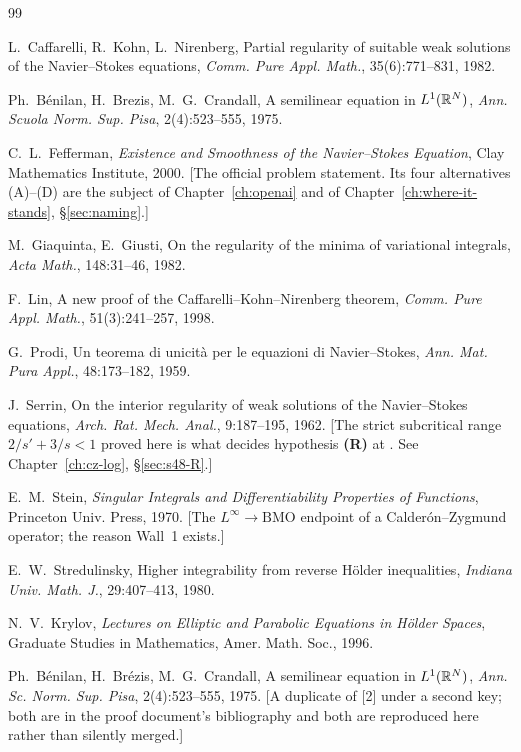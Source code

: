 \begin{thebibliography}{99}

  L.~Caffarelli, R.~Kohn, L.~Nirenberg,
  Partial regularity of suitable weak solutions of the Navier--Stokes
  equations,
  \emph{Comm. Pure Appl. Math.}, 35(6):771--831, 1982.

  Ph.~B\'enilan, H.~Brezis, M.~G.~Crandall,
  A semilinear equation in \(L^1(\mathbb{R}^N)\),
  \emph{Ann. Scuola Norm. Sup. Pisa}, 2(4):523--555, 1975.

  C.~L.~Fefferman,
  \emph{Existence and Smoothness of the Navier--Stokes Equation},
  Clay Mathematics Institute, 2000.
  \textsf{[The official problem statement. Its four alternatives (A)--(D) are
  the subject of Chapter~\ref{ch:openai} and of
  Chapter~\ref{ch:where-it-stands}, \S\ref{sec:naming}.]}

  M.~Giaquinta, E.~Giusti,
  On the regularity of the minima of variational integrals,
  \emph{Acta Math.}, 148:31--46, 1982.

  F.~Lin,
  A new proof of the Caffarelli--Kohn--Nirenberg theorem,
  \emph{Comm. Pure Appl. Math.}, 51(3):241--257, 1998.

  G.~Prodi,
  Un teorema di unicit\`a per le equazioni di Navier--Stokes,
  \emph{Ann. Mat. Pura Appl.}, 48:173--182, 1959.

  J.~Serrin,
  On the interior regularity of weak solutions of the Navier--Stokes
  equations,
  \emph{Arch. Rat. Mech. Anal.}, 9:187--195, 1962.
  \textsf{[The strict subcritical range \(2/s'+3/s<1\) proved here is what
  decides hypothesis \textbf{(R)} at . See
  Chapter~\ref{ch:cz-log}, \S\ref{sec:s48-R}.]}

  E.~M.~Stein,
  \emph{Singular Integrals and Differentiability Properties of Functions},
  Princeton Univ. Press, 1970.
  \textsf{[The \(L^\infty\to\mathrm{BMO}\) endpoint of a Calder\'on--Zygmund
  operator; the reason Wall~1 exists.]}

  E.~W.~Stredulinsky,
  Higher integrability from reverse H\"older inequalities,
  \emph{Indiana Univ. Math. J.}, 29:407--413, 1980.

  N.~V.~Krylov,
  \emph{Lectures on Elliptic and Parabolic Equations in H\"older Spaces},
  Graduate Studies in Mathematics, Amer. Math. Soc., 1996.

  Ph.~B\'enilan, H.~Br\'ezis, M.~G.~Crandall,
  A semilinear equation in \(L^1(\mathbb{R}^N)\),
  \emph{Ann. Sc. Norm. Sup. Pisa}, 2(4):523--555, 1975.
  \textsf{[A duplicate of [2] under a second key; both are in the proof
  document's bibliography and both are reproduced here rather than silently
  merged.]}


\end{thebibliography}
